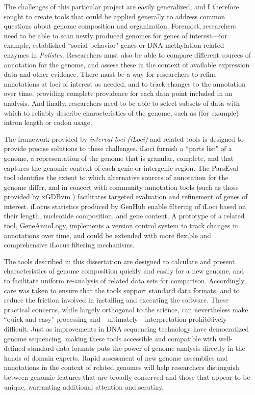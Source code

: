 The challenges of this particular project are easily generalized, and I therefore sought to create tools that could be applied generally to address common questions about genome composition and organization.
Foremost, researchers need to be able to scan newly produced genomes for genes of interest---for example, established ``social behavior" genes or DNA methylation related enzymes in \textit{Polistes}.
Researchers must also be able to compare different sources of annotation for the genome, and assess these in the context of available expression data and other evidence.
There must be a way for researchers to refine annotations at loci of interest as needed, and to track changes to the annotation over time, providing complete providence for each data point included in an analysis.
And finally, researchers need to be able to select subsets of data with which to reliably describe characteristics of the genome, such as (for example) intron length or codon usage.

The framework provided by \textit{interval loci (iLoci)} and related tools is designed to provide precise solutions to these challenges.
iLoci furnish a ``parts list" of a genome, a representation of the genome that is granular, complete, and that captures the genomic context of each genic or intergenic region.
The ParsEval tool \cite{ParsEval} identifies the extent to which alternative sources of annotation for the genome differ, and in concert with community annotation tools (such as those provided by xGDBvm \cite{xGDBvm}) facilitates targeted evaluation and refinement of genes of interest.
iLocus statistics produced by GenHub \cite{GenHub} enable filtering of iLoci based on their length, nucleotide composition, and gene content.
A prototype of a related tool, GeneAnnoLogy, implements a version control system to track changes in annotations over time, and could be extended with more flexible and comprehensive iLocus filtering mechanisms.

The tools described in this dissertation are designed to calculate and present characteristics of genome composition quickly and easily for a new genome, and to facilitate uniform re-analysis of related data sets for comparison.
Accordingly, care was taken to ensure that the tools support standard data formats, and to reduce the friction involved in installing and executing the software.
These practical concerns, while largely orthogonal to the science, can nevertheless make ``quick and easy" processing and---ultimately---interpretation prohibitively difficult.
Just as improvements in DNA sequencing technology have democratized genome sequencing, making these tools accessible and compatible with well-defined standard data formats puts the power of genome analysis directly in the hands of domain experts.
Rapid assessment of new genome assemblies and annotations in the context of related genomes will help researchers distinguish between genomic features that are broadly conserved and those that appear to be unique, warranting additional attention and scrutiny.

